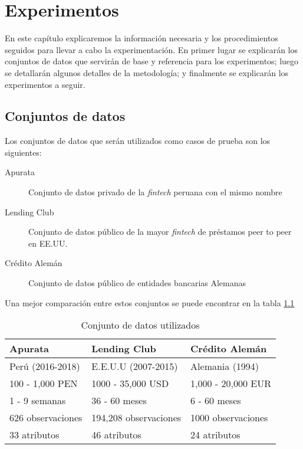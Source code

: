 \chapter{Experimentos}


En este capítulo explicaremos la información necesaria y los procedimientos seguidos para llevar a cabo la experimentación. En primer lugar se explicarán los conjuntos de datos que servirán de base y referencia para los experimentos; luego se detallarán algunos detalles de la metodología; y finalmente se explicarán los experimentos a seguir.

\section{Conjuntos de datos}

Los conjuntos de datos que serán utilizados como casos de prueba son los siguientes:

\begin{description}
    \item[Apurata] Conjunto de datos privado de la \textit{fintech} peruana con el mismo nombre
    \item[Lending Club] Conjunto de datos público de la mayor \textit{fintech} de préstamos peer to peer en EE.UU.
    \item[Crédito Alemán] Conjunto de datos público de entidades bancarias Alemanas
\end{description}

Una mejor comparación entre estos conjuntos se puede encontrar en la tabla \ref{tab:dataset-comparison}

\begin{table}
    \centering
    \caption{Conjunto de datos utilizados}
    \label{tab:dataset-comparison}
    \begin{tabular}{@{}lll@{}}
    \toprule
    \textbf{Apurata}  & \textbf{Lending Club} & \textbf{Crédito Alemán} \\
    \midrule
    Perú (2016-2018)  & E.E.U.U (2007-2015)   & Alemania (1994)         \\
    100 - 1,000 PEN   & 1000 - 35,000 USD     & 1,000 - 20,000 EUR      \\
    1 - 9 semanas     & 36 - 60 meses         & 6 - 60 meses            \\ 
    626 observaciones & 194,208 observaciones & 1000 observaciones      \\
    33 atributos      & 46 atributos          & 24 atributos            \\
    \bottomrule
    \end{tabular}
\end{table}

